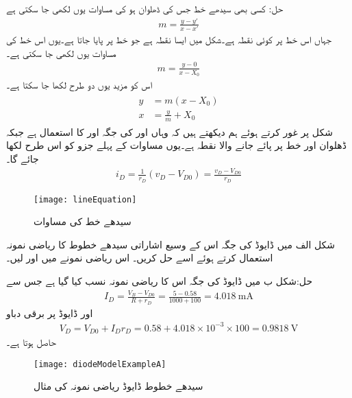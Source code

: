 حل: کسی بھی سیدھے خط جس کی ڈھلوان   ہو کی مساوات یوں لکھی جا سکتی ہے
\begin{align*}
m=\frac{y-y'}{x-x'}
\end{align*}
جہاں   اس خط پر کوئی نقطہ ہے۔شکل میں  ایسا نقطہ ہے جو خط پر پایا جاتا ہے۔یوں اس خط کی مساوات یوں لکھی جا سکتی ہے۔
\begin{align*}
m=\frac{y-0}{x-X_0}
\end{align*}
اس کو مزید یوں دو طرح لکھا جا سکتا ہے۔
\begin{gather} \label{مساوات_ڈایوڈ_سیدھے_خط_کے_دو_مساوات}
\begin{aligned}
y&=m (x-X_0)\\
x&=\frac{y}{m}+X_0
\end{aligned}
\end{gather}
شکل   پر غور کرتے ہوئے ہم دیکھتے ہیں کہ وہاں  اور  کی جگہ  اور  کا استعمال ہے جبکہ ڈھلوان  اور خط پر پائے جانے والا نقطہ  ہے۔یوں مساوات   کے پہلے جزو کو اس طرح لکھا جائے گا۔
\begin{align*}
i_D=\frac{1}{r_D} (v_D-V_{D0})=\frac{v_D-V_{D0}}{r_D}
\end{align*}
%
\begin{figure}
\centering
\texttt{[image: lineEquation]}
\caption{ سیدھے خط کی مساوات}
\label{شکل_سیدھے_خط_کی_مساوات}
\end{figure}


 
شکل  الف میں ڈایوڈ کی جگہ اس کے وسیع اشاراتی سیدھے خطوط کا ریاضی نمونہ استعمال کرتے ہوئے اسے حل کریں۔
اس ریاضی نمونے میں  اور   لیں۔

حل:شکل  ب میں ڈایوڈ کی جگہ اس کا ریاضی نمونہ نسب کیا گیا ہے جس سے
\begin{align*}
I_D=\frac{V_B-V_{D0}}{R+r_D}=\frac{5-0.58}{1000+100}=\SI{4.018}{\milli \ampere}
\end{align*}
اور ڈایوڈ پر برقی دباو
\begin{align*}
V_D=V_{D0}+I_D r_D=0.58+4.018 \times 10^{-3} \times 100=\SI{0.9818}{\volt}
\end{align*}
حاصل ہوتا ہے۔

\begin{figure}
\centering
\texttt{[image: diodeModelExampleA]}
\caption{سیدھے خطوط  ڈایوڈ ریاضی نمونہ کی مثال}
\label{شکل_سیدھے_خط_کا_ماڈل}
\end{figure}

